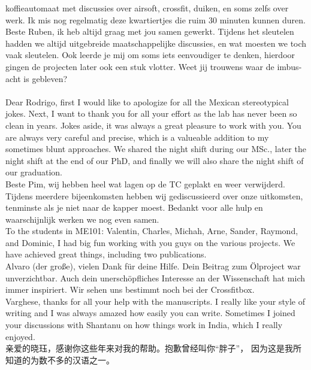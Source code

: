 koffieautomaat met discussies over airsoft, crossfit, duiken, en soms zelfs
over werk. Ik mis nog regelmatig deze kwartiertjes die ruim 30 minuten kunnen
duren.\\
\indent Beste Ruben, ik heb altijd graag met jou samen gewerkt.
Tijdens het sleutelen hadden we altijd uitgebreide maatschappelijke
discussies, en wat moesten we toch vaak sleutelen. Ook leerde je mij om soms
iets eenvoudiger te denken, hierdoor gingen de projecten later ook een stuk
vlotter. Weet jij trouwens waar de imbus-acht is gebleven?\\\\
\mf{\flagus}\indent Dear Rodrigo, first I would like to apologize for all the
Mexican stereotypical jokes. Next, I want to thank you for all your effort as
the lab has never been so clean in years. Jokes aside, it was always a great
pleasure to work with you. You are always very careful and precise, which is a
valueable addition to my sometimes blunt approaches. We shared the night shift
during our MSc., later the night shift at the end of our PhD, and finally we
will also share the night shift of our graduation.\\
\mf{\flagnl}\indent Beste Pim, wij hebben heel wat lagen op de TC geplakt en
weer verwijderd. Tijdens meerdere bijeenkomsten hebben wij gediscussieerd over
onze uitkomsten, tenminste als je niet naar de kapper moest. Bedankt voor alle
hulp en waarschijnlijk werken we nog even samen.\\
\mf{\flagus}\indent To the students in ME101: Valentin, Charles, Michah, Arne,
Sander, Raymond, and Dominic, I had big fun working with you guys on the
various projects. We have achieved great things, including two publications.\\
\mf{\flagde}\indent Alvaro (der gro{\ss}e), vielen Dank f\"ur deine Hilfe. Dein
Beitrag zum \"Olproject war unverzichtbar. Auch dein unersch\"opfliches
Interesse an der Wissenschaft hat mich immer inspiriert. Wir sehen uns
bestimmt noch bei der Crossfitbox.\\
\mf{\flagus}\indent Varghese, thanks for all your help with the manuscripts. I
really like your style of writing and I was always amazed how easily you can
write. Sometimes I joined your discussions with Shantanu on how things
work in India, which I really enjoyed.\\
\mf{\flagcn}\indent 亲爱的晓珏，感谢你这些年来对我的帮助。抱歉曾经叫你“胖子”，
因为这是我所知道的为数不多的汉语之一。\\
